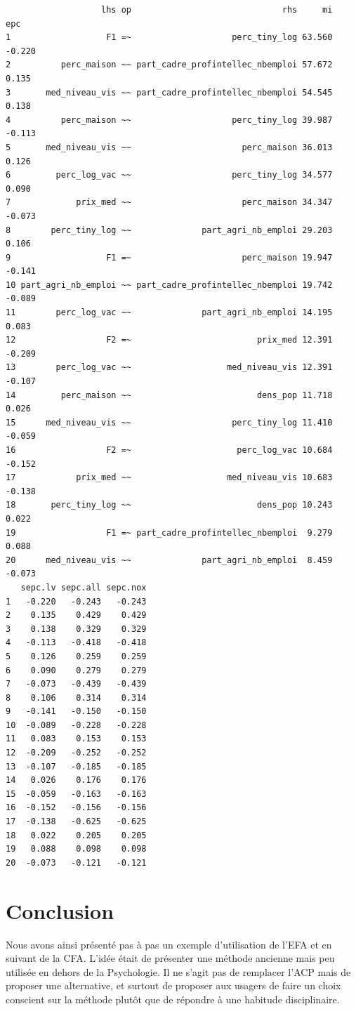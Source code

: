 \documentclass[
  french,
  11pt,
  a4paper,
]{article}
\begin{document}
\begin{verbatim}
                   lhs op                              rhs     mi    epc
1                   F1 =~                    perc_tiny_log 63.560 -0.220
2          perc_maison ~~ part_cadre_profintellec_nbemploi 57.672  0.135
3       med_niveau_vis ~~ part_cadre_profintellec_nbemploi 54.545  0.138
4          perc_maison ~~                    perc_tiny_log 39.987 -0.113
5       med_niveau_vis ~~                      perc_maison 36.013  0.126
6         perc_log_vac ~~                    perc_tiny_log 34.577  0.090
7             prix_med ~~                      perc_maison 34.347 -0.073
8        perc_tiny_log ~~              part_agri_nb_emploi 29.203  0.106
9                   F1 =~                      perc_maison 19.947 -0.141
10 part_agri_nb_emploi ~~ part_cadre_profintellec_nbemploi 19.742 -0.089
11        perc_log_vac ~~              part_agri_nb_emploi 14.195  0.083
12                  F2 =~                         prix_med 12.391 -0.209
13        perc_log_vac ~~                   med_niveau_vis 12.391 -0.107
14         perc_maison ~~                         dens_pop 11.718  0.026
15      med_niveau_vis ~~                    perc_tiny_log 11.410 -0.059
16                  F2 =~                     perc_log_vac 10.684 -0.152
17            prix_med ~~                   med_niveau_vis 10.683 -0.138
18       perc_tiny_log ~~                         dens_pop 10.243  0.022
19                  F1 =~ part_cadre_profintellec_nbemploi  9.279  0.088
20      med_niveau_vis ~~              part_agri_nb_emploi  8.459 -0.073
   sepc.lv sepc.all sepc.nox
1   -0.220   -0.243   -0.243
2    0.135    0.429    0.429
3    0.138    0.329    0.329
4   -0.113   -0.418   -0.418
5    0.126    0.259    0.259
6    0.090    0.279    0.279
7   -0.073   -0.439   -0.439
8    0.106    0.314    0.314
9   -0.141   -0.150   -0.150
10  -0.089   -0.228   -0.228
11   0.083    0.153    0.153
12  -0.209   -0.252   -0.252
13  -0.107   -0.185   -0.185
14   0.026    0.176    0.176
15  -0.059   -0.163   -0.163
16  -0.152   -0.156   -0.156
17  -0.138   -0.625   -0.625
18   0.022    0.205    0.205
19   0.088    0.098    0.098
20  -0.073   -0.121   -0.121
\end{verbatim}

\section*{Conclusion}\label{conclusion}

Nous avons ainsi présenté pas à pas un exemple d'utilisation de l'EFA et
en suivant de la CFA. L'idée était de présenter une méthode ancienne
mais peu utilisée en dehors de la Psychologie. Il ne s'agit pas de
remplacer l'ACP mais de proposer une alternative, et surtout de proposer
aux usagers de faire un choix conscient sur la méthode plutôt que de
répondre à une habitude disciplinaire.
\end{document}
